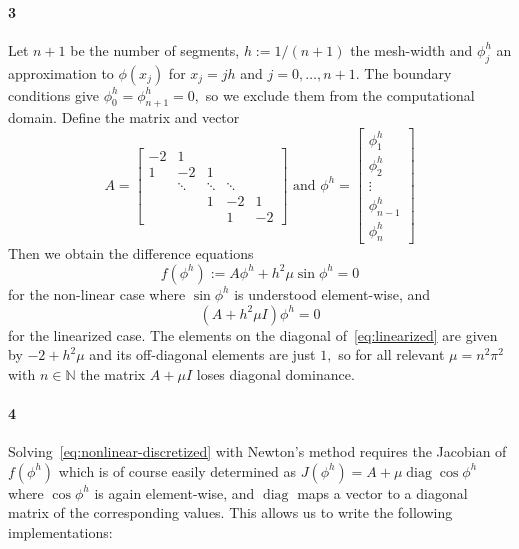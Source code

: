 \documentclass[a4paper]{article}
\DeclareMathOperator{\diag}{diag}
\begin{document}
  \paragraph{3} Let $n + 1$ be the number of segments, $h := 1 / (n + 1)$ the mesh-width and $\phi^h_j$ an approximation to $\phi(x_j)$ for $x_j = jh$ and $j = 0, \dots, n + 1.$ The boundary conditions give $\phi^h_0 = \phi^h_{n+1} = 0,$ so we exclude them from the computational domain. Define the matrix and vector
  \begin{equation}
    A = \begin{bmatrix}
      -2 & 1  &   &        & \\
      1  & -2 & 1 &  & \\
         & \ddots & \ddots & \ddots \\
         &        & 1      & -2 & 1\\
         &        &        & 1  & -2
    \end{bmatrix} \text{ and }
    \phi^h = \begin{bmatrix}
      \phi^h_1 \\ \phi^h_2 \\ \vdots \\ \phi^h_{n-1} \\ \phi^h_n
    \end{bmatrix}
  \end{equation}
  Then we obtain the difference equations
  \begin{equation}\label{eq:nonlinear-discretized}
    f(\phi^h) := A\phi^h + h^2\mu \sin \phi^h = 0
  \end{equation}
  for the non-linear case where $\sin \phi^h$ is understood element-wise, and
  \begin{equation}\label{eq:linearized}
    (A + h^2\mu I)\phi^h = 0
  \end{equation}
  for the linearized case. The elements on the diagonal of~\eqref{eq:linearized} are given by $-2 + h^2\mu$ and its off-diagonal elements are just $1,$ so for all relevant $\mu = n^2\pi^2$ with $n\in \mathbb{N}$ the matrix $A + \mu I$ loses diagonal dominance.

  \paragraph{4} Solving~\eqref{eq:nonlinear-discretized} with Newton's method requires the Jacobian of $f(\phi^h)$ which is of course easily determined as $J(\phi^h) = A + \mu \diag \cos \phi^h$ where $\cos \phi^h$ is again element-wise, and $\diag$ maps a vector to a diagonal matrix of the corresponding values. This allows us to write the following implementations:
\end{document}
